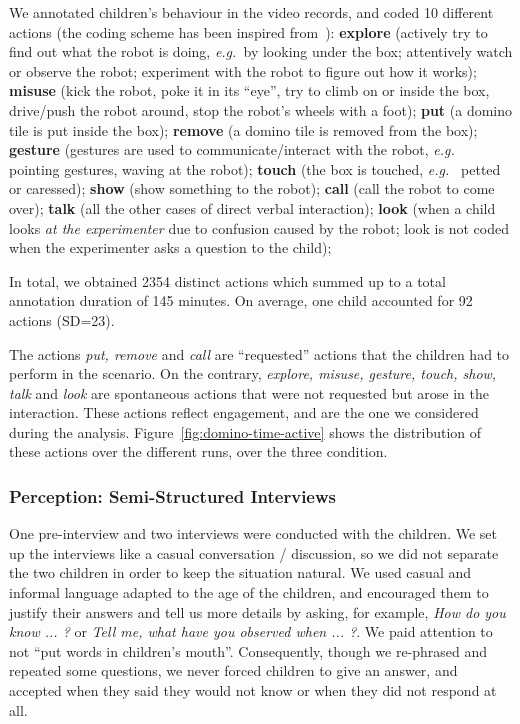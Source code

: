 \documentclass{sig-alternate}
\newcommand{\eg}{{\textit{e.g.~}}}
\begin{document}
We annotated children's behaviour in the video records, and coded 10 different
actions (the coding scheme has been inspired from~\cite{fink2014which}):
\textbf{explore} (actively try to find out what the robot is doing, \eg by
looking under the box; attentively watch or observe the robot; experiment with
the robot to figure out how it works); \textbf{misuse} (kick the robot, poke it
in its ``eye'', try to climb on or inside the box, drive/push the robot around,
stop the robot's wheels with a foot); \textbf{put} (a domino tile is put inside
the box); \textbf{remove} (a domino tile is removed from the box);
\textbf{gesture} (gestures are used to communicate/interact with the robot, \eg
pointing gestures, waving at the robot); \textbf{touch} (the box is touched, \eg
petted or caressed); \textbf{show} (show something to the robot); \textbf{call}
(call the robot to come over); \textbf{talk} (all the other cases of direct
verbal interaction); \textbf{look} (when a child looks \emph{at the
experimenter} due to confusion caused by the robot; look is not coded when the
experimenter asks a question to the child);


In total, we obtained 2354 distinct actions which summed up to a total
annotation duration of 145 minutes. On average, one child accounted for 92
actions (SD=23).

The actions \textit{put, remove} and \textit{call} are ``requested'' actions
that the children had to perform in the scenario. On the contrary,
\textit{explore, misuse, gesture, touch, show, talk} and \textit{look} are
spontaneous actions that were not requested but arose in the interaction.  These
actions reflect engagement, and are the one we considered during the analysis.
Figure~\ref{fig:domino-time-active} shows the distribution of these actions over
the different runs, over the three condition.

\subsubsection{Perception: Semi-Structured Interviews}

One pre-interview and two interviews were conducted with the children.  We set
up the interviews like a casual conversation / discussion, so we did not
separate the two children in order to keep the situation natural. We used casual
and informal language adapted to the age of the children, and encouraged them to
justify their answers and tell us more details by asking, for example,
\textit{How do you know ... ?} or \textit{Tell me, what have you observed when
... ?}. We paid attention to not ``put words in children's mouth''.
Consequently, though we re-phrased and repeated some questions, we never forced
children to give an answer, and accepted when they said they would not know or
when they did not respond at all.	
\end{document}
